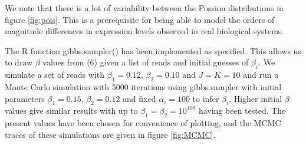 \documentclass{article}
\begin{document}
We note that there is a lot of variability between the Possion distributions in figure \ref{fig:pois}. This is a prerequisite for being able to model the orders of magnitude differences in expression levels observed in real biological systems.


The R function gibbs.sampler() has been implemented as specified. This allows us to draw $\beta$ values from (6) given a list of reads and initial guesses of $\beta_i$. We simulate a set of reads with $\beta_1 = 0.12$, $\beta_2 = 0.10$ and $J = K = 10$ and run a Monte Carlo simulation with 5000 iterations using gibbs.sampler with initial parameters $\beta_1 = 0.15$, $\beta_2 = 0.12$ and fixed $\alpha_i= 100$ to infer $\beta_i$. Higher initial $\beta$ values give similar results with up to $\beta_1 = \beta_2 = 10^{100}$ having been tested. The present values have been chosen for convenience of plotting, and the MCMC traces of these simulations are given in figure \ref{fig:MCMC}.
\end{document}
